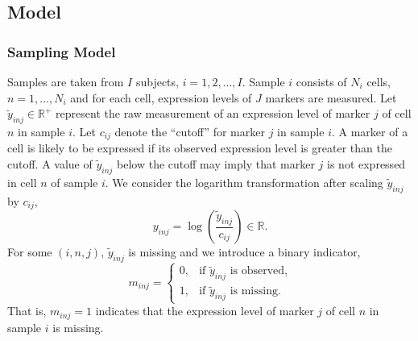 \documentclass[12pt,]{article}
\providecommand{\tightlist}{%
  \setlength{\itemsep}{0pt}\setlength{\parskip}{0pt}}
\newcommand{\p}[1]{\left(#1\right)}
\begin{document}
\subsection{Model}\label{prob-model}
\subsubsection{Sampling Model} 
Samples are taken from \(I\) subjects, \(i = 1,2,...,I\). Sample \(i\)
consists of \(N_i\) cells, \(n=1, \ldots, N_i\) and for each cell,
expression levels of \(J\) markers are measured. Let
\(\tilde{y}_{inj} \in \mathbb{R}^+\) represent the raw measurement of an
expression level of marker \(j\) of cell \(n\) in sample \(i\). Let
\(c_{ij}\) denote the ``cutoff'' for
 marker \(j\) in sample \(i\). A marker of a cell is likely to be expressed if its observed expression level is greater than the cutoff. A value of $\tilde{y}_{inj}$ below the cutoff may imply that marker $j$ is not expressed in cell $n$ of sample $i$.    We consider the logarithm transformation
after scaling \(\tilde{y}_{inj}\) by \(c_{ij}\), \[
y_{inj}=\log\p{\frac{\tilde{y}_{inj}}{c_{ij}}} \in \mathbb{R}.
\] For some \((i, n, j)\), \(\tilde{y}_{inj}\) is missing and we
introduce a binary indicator, \[
m_{inj} = \begin{cases}
  0, & \text{if $\tilde{y}_{inj}$ is observed,} \\
  1, & \text{if $\tilde{y}_{inj}$ is missing.}
\end{cases}
\] That is, \(m_{inj}=1\) indicates that the expression level of marker
\(j\) of cell \(n\) in sample \(i\) is missing.

\def\labelenumi{\arabic{enumi}.}

\end{document}
